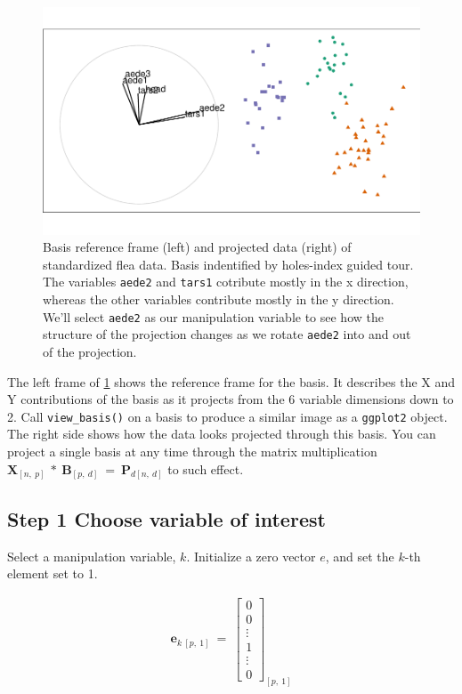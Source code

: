 \documentclass{monashthesis}
\begin{document}
\begin{figure}
\centering
\includegraphics{thesis_files/figure-latex/step0-1.pdf}
\caption{\label{fig:step0}Basis reference frame (left) and projected data
(right) of standardized flea data. Basis indentified by holes-index
guided tour. The variables \texttt{aede2} and \texttt{tars1} cotribute
mostly in the x direction, whereas the other variables contribute mostly
in the y direction. We'll select \texttt{aede2} as our manipulation
variable to see how the structure of the projection changes as we rotate
\texttt{aede2} into and out of the projection.}
\end{figure}

The left frame of \ref{fig:step0} shows the reference frame for the
basis. It describes the X and Y contributions of the basis as it
projects from the 6 variable dimensions down to 2. Call
\texttt{view\_basis()} on a basis to produce a similar image as a
\texttt{ggplot2} object. The right side shows how the data looks
projected through this basis. You can project a single basis at any time
through the matrix multiplication
\(\textbf{X}_{[n,~p]} ~*~ \textbf{B}_{[p,~d]} ~=~ \textbf{P}_{d[n,~d]}\)
to such effect.

\subsection{Step 1 Choose variable of
interest}\label{step-1-choose-variable-of-interest}

Select a manipulation variable, \(k\). Initialize a zero vector \(e\),
and set the \(k\)-th element set to 1.

\begin{align*}
\textbf{e}_{k~[p,~1]} ~=~ 
  \begin{bmatrix}
    0 \\
    0 \\
    \vdots \\
    1 \\
    \vdots \\
    0
  \end{bmatrix}_{[p,~1]}
\end{align*}
\end{document}
